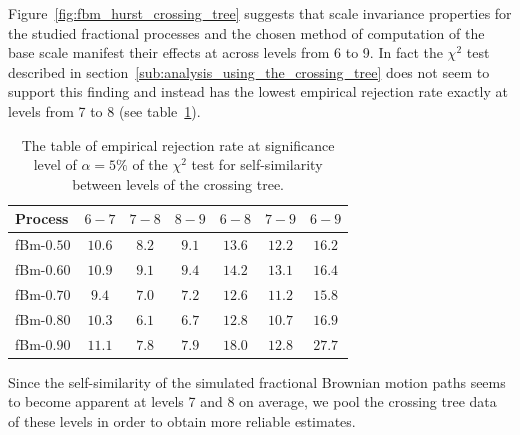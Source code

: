 \documentclass[a4paper]{article}
\begin{document}
Figure~\ref{fig:fbm_hurst_crossing_tree} suggests that scale invariance properties
for the studied fractional processes and the chosen method of computation of the
base scale manifest their effects at across levels from 6 to 9. In fact the $\chi^2$
test described in section~\ref{sub:analysis_using_the_crossing_tree} does not seem
to support this finding and instead has the lowest empirical rejection rate exactly
at levels from 7 to 8 (see table~\ref{tbl:chi_sq_test_for_fbm_only}).
\begin{table}[h]\begin{center}
	\begin{tabular}{l||c|c|c|c|c|c|}
	Process 		&  $6-7$ &          $7-8$ & $8-9$ &  $6-8$ &  $7-9$ &  $6-9$ \\ \hline\hline
	fBm-$0.50$ 		& $10.6$ & $\mathbf{8.2}$ & $9.1$ & $13.6$ & $12.2$ & $16.2$ \\ \hline 
	fBm-$0.60$ 		& $10.9$ & $\mathbf{9.1}$ & $9.4$ & $14.2$ & $13.1$ & $16.4$ \\ \hline 
	fBm-$0.70$ 		&  $9.4$ & $\mathbf{7.0}$ & $7.2$ & $12.6$ & $11.2$ & $15.8$ \\ \hline 
	fBm-$0.80$ 		& $10.3$ & $\mathbf{6.1}$ & $6.7$ & $12.8$ & $10.7$ & $16.9$ \\ \hline 
	fBm-$0.90$ 		& $11.1$ & $\mathbf{7.8}$ & $7.9$ & $18.0$ & $12.8$ & $27.7$ \\ \hline 
 	\end{tabular}
	\caption{The table of empirical rejection rate at significance level of $\alpha = 5\%$
	of the $\chi^2$ test for self-similarity between levels of the crossing tree. }
\label{tbl:chi_sq_test_for_fbm_only}
\end{center}\end{table}
Since the self-similarity of the simulated fractional Brownian motion paths seems
to become apparent at levels 7 and 8 on average, we pool the crossing tree data of
these levels in order to obtain more reliable estimates.
\end{document}
